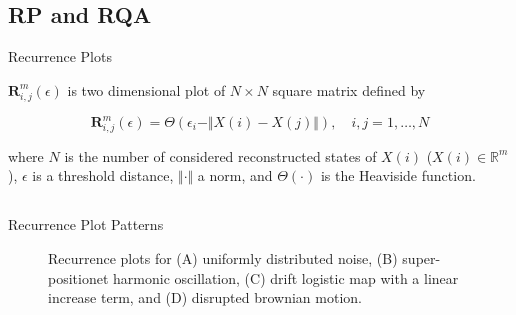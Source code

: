 \subsection{RP and RQA}
{

\begin{frame}{Recurrence Plots}


$\mathbf{R}^{m}_{i,j} (\epsilon)$ is two dimensional plot of $N \times N$ square matrix
defined by

\begin{equation*}
\mathbf{R}^{m}_{i,j} (\epsilon) = 
\Theta ( \epsilon_i - \Vert X(i) - X(j) \Vert ), 
\quad i,j=1,\dots,N
\end{equation*}

where $N$ is the number of considered reconstructed states of $X(i)$
($X(i) \in \mathbb{R}^m$), 
$\epsilon$ is a threshold distance, 
$ \Vert  \cdot \Vert$ a norm, 
and $\Theta( \cdot )$ is the Heaviside function.

\end{frame}
}




\subsection{}
{

\begin{frame}{Recurrence Plot Patterns}
    \begin{figure}
	\caption{Recurrence plots for (A) uniformly distributed noise,
		(B) super-positionet harmonic oscillation,
		(C) drift logistic map with a linear increase term, and
		(D) disrupted brownian motion.
		} 
   \end{figure}
	
\end{frame}
}


